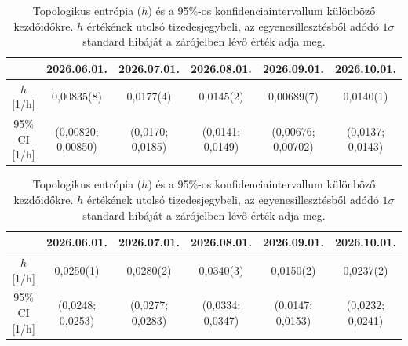 \documentclass[12pt,a4paper]{article}
\begin{document}
\begin{table}[H]
    \centering
    \footnotesize
    \begin{subtable}{\textwidth}
        \centering
        \begin{tabular}{|c|c|c|c|c|c|}\hline
            & \textbf{2026.06.01.} & \textbf{2026.07.01.} & \textbf{2026.08.01.} & \textbf{2026.09.01.} & \textbf{2026.10.01.} \\\hline
            $h$ [1/h] & 0,00835(8) & 0,0177(4) & 0,0145(2) & 0,00689(7) & 0,0140(1) \\\hline
            95\% CI [1/h] & (0,00820; 0,00850) & (0,0170; 0,0185) & (0,0141; 0,0149) & (0,00676; 0,00702) & (0,0137; 0,0143) \\\hline
        \end{tabular}
        \caption{AIFS}
    \end{subtable}

    \vspace{0.6cm}

    \begin{subtable}{\textwidth}
        \centering
        \begin{tabular}{|c|c|c|c|c|c|}\hline
            & \textbf{2026.06.01.} & \textbf{2026.07.01.} & \textbf{2026.08.01.} & \textbf{2026.09.01.} & \textbf{2026.10.01.} \\\hline
            $h$ [1/h] & 0,0250(1) & 0,0280(2) & 0,0340(3) & 0,0150(2) & 0,0237(2) \\\hline
            95\% CI [1/h] & (0,0248; 0,0253) & (0,0277; 0,0283) & (0,0334; 0,0347) & (0,0147; 0,0153) & (0,0232; 0,0241) \\\hline
        \end{tabular}
        \caption{IFS}
    \end{subtable}
    \caption{Topologikus entrópia ($h$) és a 95\%-os konfidenciaintervallum különböző kezdőidőkre. $h$ értékének utolsó tizedesjegybeli, az egyenesillesztésből adódó $1 \sigma$ standard hibáját a zárójelben lévő érték adja meg.}
    \label{tab:trade850_top}
\end{table}
\end{document}
